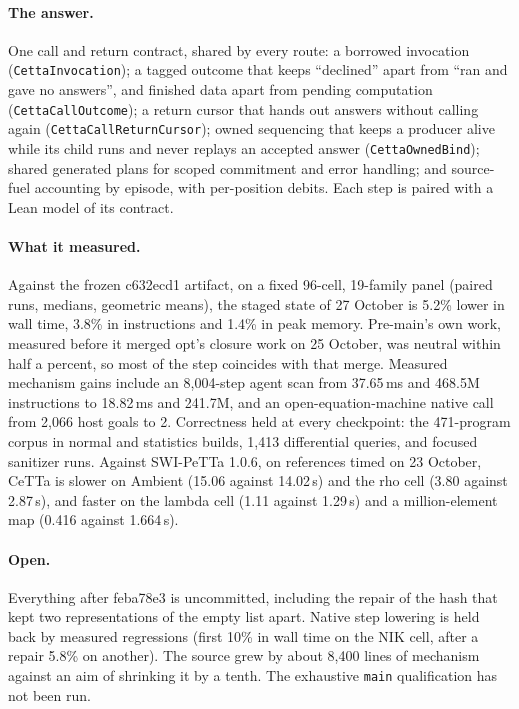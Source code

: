 \documentclass[11pt]{article}
\newcommand{\code}[1]{\texttt{#1}}
\newcommand{\PeTTa}{\textup{PeTTa}}
\newcommand{\CeTTa}{\textup{CeTTa}}
\begin{document}
\paragraph{The answer.}  One call and return contract, shared by every route:
a borrowed invocation (\code{CettaInvocation}); a tagged outcome that keeps
``declined'' apart from ``ran and gave no answers'', and finished data apart
from pending computation (\code{CettaCallOutcome}); a return cursor that
hands out answers without calling again (\code{CettaCallReturnCursor});
owned sequencing that keeps a producer alive while its child runs and never
replays an accepted answer (\code{CettaOwnedBind}); shared generated plans for
scoped commitment and error handling; and source-fuel accounting by episode,
with per-position debits.  Each step is paired with a Lean model of its
contract.

\paragraph{What it measured.}  Against the frozen c632ecd1 artifact, on a
fixed 96-cell, 19-family panel (paired runs, medians, geometric means), the
staged state of 27 October is 5.2\% lower in wall time, 3.8\% in instructions
and 1.4\% in peak memory.  Pre-main's own work, measured before it merged
opt's closure work on 25 October, was neutral within half a percent, so most
of the step coincides with that merge.  Measured mechanism gains include an 8{,}004-step agent scan from
37.65\,ms and 468.5M instructions to 18.82\,ms and 241.7M, and an
open-equation-machine native call from 2{,}066 host goals to 2.  Correctness
held at every checkpoint: the 471-program corpus in normal and statistics
builds, 1{,}413 differential queries, and focused sanitizer runs.  Against
SWI-\PeTTa{} 1.0.6, on references timed on 23 October, \CeTTa{} is slower on
Ambient (15.06 against 14.02\,s) and the rho cell (3.80 against 2.87\,s), and
faster on the lambda cell (1.11 against 1.29\,s) and a million-element map
(0.416 against 1.664\,s).

\paragraph{Open.}  Everything after feba78e3 is uncommitted, including the
repair of the hash that kept two representations of the empty list apart.
Native step lowering is held back by measured regressions (first 10\% in
wall time on the NIK cell, after a repair 5.8\% on another).  The source grew by about 8{,}400 lines of mechanism
against an aim of shrinking it by a tenth.  The exhaustive \code{main}
qualification has not been run.
\end{document}
